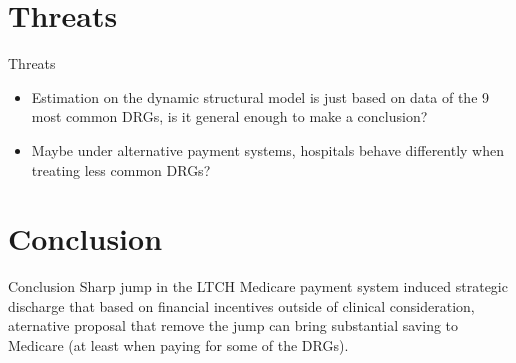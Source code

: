 \documentclass{beamer}
\begin{document}
\section{Threats}
\begin{frame}{Threats}
\begin{itemize}
\item Estimation on the dynamic structural model is just based on data of the 9 most common DRGs, is it general enough to make a conclusion? 
\item Maybe under alternative payment systems, hospitals behave differently when treating less common DRGs? 
\end{itemize}
\end{frame}

\section{Conclusion}
\begin{frame}{Conclusion}
Sharp jump in the LTCH Medicare payment system induced strategic discharge that based on financial incentives outside of clinical consideration, aternative proposal that remove the jump can bring substantial saving to Medicare (at least when paying for some of the DRGs).
\end{frame}
\end{document}
